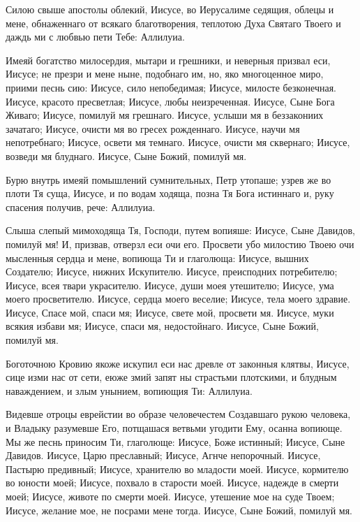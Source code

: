 \begin{mymulticols}

Силою
свыше апостолы облекий, Иисусе, во Иерусалиме седящия, облецы и мене, обнаженнаго от всякаго благотворения, теплотою Духа Святаго Твоего и даждь ми с любвью пети Тебе: Аллилуиа.


Имеяй
богатство милосердия, мытари и грешники, и неверныя призвал еси, Иисусе; не презри и мене ныне, подобнаго им, но, яко многоценное миро, приими песнь сию: Иисусе, сило непобедимая; Иисусе, милосте
безконечная. Иисусе, красото пресветлая; Иисусе, любы неизреченная. Иисусе, Сыне Бога Живаго; Иисусе, помилуй мя грешнаго. Иисусе, услыши мя в беззакониих зачатаго; Иисусе, очисти мя во гресех рожденнаго. Иисусе, научи мя непотребнаго; Иисусе, освети мя темнаго. Иисусе, очисти мя сквернаго; Иисусе, возведи мя блуднаго. Иисусе, Сыне Божий, помилуй мя.


Бурю
внутрь имеяй помышлений сумнительных, Петр утопаше; узрев же во плоти Тя суща, Иисусе, и по водам ходяща, позна Тя Бога истиннаго и, руку спасения получив, рече: Аллилуиа.


Слыша
слепый мимоходяща Тя, Господи, путем вопияше: Иисусе, Сыне Давидов, помилуй мя! И, призвав, отверзл еси очи его. Просвети убо милостию Твоею очи мысленныя сердца и мене, вопиюща Ти и глаголюща: Иисусе, вышних Создателю; Иисусе, нижних Искупителю. Иисусе, преисподних потребителю; Иисусе, всея твари украсителю. Иисусе, души моея утешителю; Иисусе, ума моего просветителю. Иисусе, сердца моего веселие; Иисусе, тела моего здравие. Иисусе, Спасе мой, спаси мя; Иисусе, свете мой, просвети мя. Иисусе, муки всякия избави мя; Иисусе, спаси мя, недостойнаго. Иисусе, Сыне Божий, помилуй мя.


Боготочною
Кровию якоже искупил еси нас древле от законныя клятвы, Иисусе, сице изми нас от сети, еюже змий запят ны страстьми плотскими, и блудным наваждением, и злым унынием, вопиющия Ти: Аллилуиа.


Видевше
отроцы еврейстии во образе человечестем Создавшаго рукою человека, и Владыку разумевше Его, потщашася ветвьми угодити Ему, осанна вопиюще. Мы же песнь приносим Ти, глаголюще: Иисусе, Боже истинный; Иисусе, Сыне Давидов. Иисусе, Царю преславный; Иисусе, Агнче непорочный. Иисусе, Пастырю предивный; Иисусе, хранителю во младости моей. Иисусе, кормителю во юности моей; Иисусе, похвало в старости моей. Иисусе, надежде в смерти моей; Иисусе, животе по смерти моей. Иисусе, утешение мое на суде Твоем; Иисусе, желание мое, не посрами мене тогда. Иисусе, Сыне Божий, помилуй мя.


\end{mymulticols}
